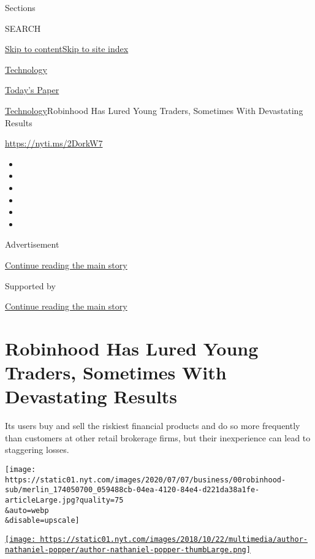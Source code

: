 Sections

SEARCH

\protect\hyperlink{site-content}{Skip to
content}\protect\hyperlink{site-index}{Skip to site index}

\href{https://www.nytimes.com/section/technology}{Technology}

\href{https://myaccount.nytimes.com/auth/login?response_type=cookie\&client_id=vi}{}

\href{https://www.nytimes.com/section/todayspaper}{Today's Paper}

\href{/section/technology}{Technology}\textbar{}Robinhood Has Lured
Young Traders, Sometimes With Devastating Results

\url{https://nyti.ms/2DorkW7}

\begin{itemize}
\item
\item
\item
\item
\item
\item
\end{itemize}

Advertisement

\protect\hyperlink{after-top}{Continue reading the main story}

Supported by

\protect\hyperlink{after-sponsor}{Continue reading the main story}

\hypertarget{robinhood-has-lured-young-traders-sometimes-with-devastating-results}{%
\section{Robinhood Has Lured Young Traders, Sometimes With Devastating
Results}\label{robinhood-has-lured-young-traders-sometimes-with-devastating-results}}

Its users buy and sell the riskiest financial products and do so more
frequently than customers at other retail brokerage firms, but their
inexperience can lead to staggering losses.

\texttt{[image: https://static01.nyt.com/images/2020/07/07/business/00robinhood-sub/merlin\_174050700\_059488cb-04ea-4120-84e4-d221da38a1fe-articleLarge.jpg?quality=75\\\&auto=webp\\\&disable=upscale]}

\href{https://www.nytimes.com/by/nathaniel-popper}{\texttt{[image: https://static01.nyt.com/images/2018/10/22/multimedia/author-nathaniel-popper/author-nathaniel-popper-thumbLarge.png]}}


